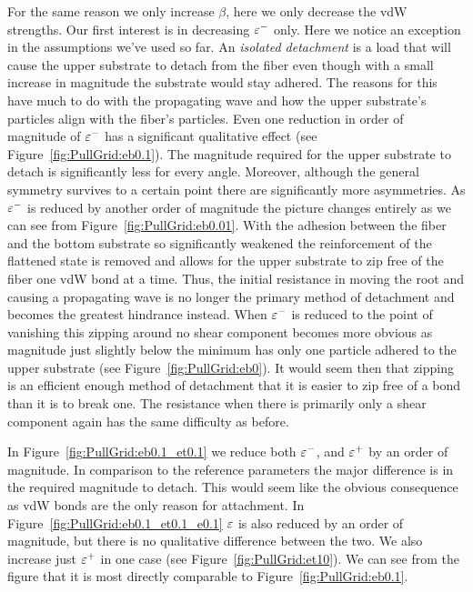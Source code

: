 For the same reason we only increase $\beta$, here we only decrease the vdW strengths. Our first interest is in decreasing $\varepsilon^-$ only. Here we notice an exception in the assumptions we've used so far. An \textit{isolated detachment} is a load that will cause the upper substrate to detach from the fiber even though with a small increase in magnitude the substrate would stay adhered. The reasons for this have much to do with the propagating wave and how the upper substrate's particles align with the fiber's particles. Even one reduction in order of magnitude of $\varepsilon^-$ has a significant qualitative effect (see Figure~\ref{fig:PullGrid:eb0.1}). The magnitude required for the upper substrate to detach is significantly less for every angle. Moreover, although the general symmetry survives to a certain point there are significantly more asymmetries. As $\varepsilon^-$ is reduced by another order of magnitude the picture changes entirely as we can see from Figure~\ref{fig:PullGrid:eb0.01}. With the adhesion between the fiber and the bottom substrate so significantly weakened the reinforcement of the flattened state is removed and allows for the upper substrate to zip free of the fiber one vdW bond at a time. Thus, the initial resistance in moving the root and causing a propagating wave is no longer the primary method of detachment and becomes the greatest hindrance instead. When $\varepsilon^-$ is reduced to the point of vanishing this zipping around no shear component becomes more obvious as magnitude just slightly below the minimum has only one particle adhered to the upper substrate (see Figure~\ref{fig:PullGrid:eb0}). It would seem then that zipping is an efficient enough method of detachment that it is easier to zip free of a bond than it is to break one. The resistance when there is primarily only a shear component again has the same difficulty as before.

In Figure~\ref{fig:PullGrid:eb0.1_et0.1} we reduce both $\varepsilon^-$, and $\varepsilon^+$ by an order of magnitude. In comparison to the reference parameters the major difference is in the required magnitude to detach. This would seem like the obvious consequence as vdW bonds are the only reason for attachment. In Figure~\ref{fig:PullGrid:eb0.1_et0.1_e0.1} $\varepsilon$ is also reduced by an order of magnitude, but there is no qualitative difference between the two. We also increase just $\varepsilon^+$ in one case (see Figure~\ref{fig:PullGrid:et10}). We can see from the figure that it is most directly comparable to Figure~\ref{fig:PullGrid:eb0.1}.

